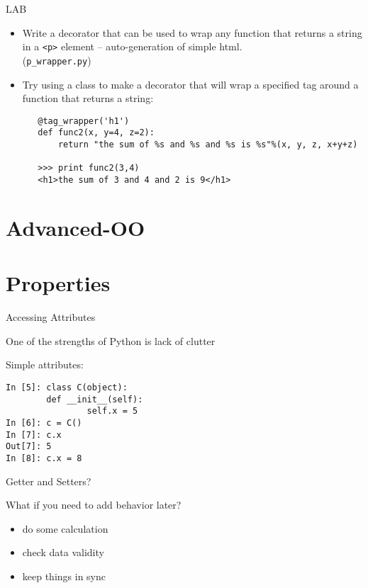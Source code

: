 \documentclass{beamer}
\begin{document}
\begin{frame}[fragile]{LAB}

\begin{itemize}
  \item Write a decorator that can be used to wrap any function that returns a string in a \verb|<p>| element -- auto-generation of simple html.\\
 (\verb|p_wrapper.py|)      

  \item Try using a class to make a decorator that will wrap a
   specified tag around a function that returns a string:
   \begin{verbatim}
   @tag_wrapper('h1')
   def func2(x, y=4, z=2):
       return "the sum of %s and %s and %s is %s"%(x, y, z, x+y+z)

   >>> print func2(3,4)
   <h1>the sum of 3 and 4 and 2 is 9</h1>
   \end{verbatim}
\end{itemize}

\end{frame}



\section{Advanced-OO}

\section{Properties}

\begin{frame}[fragile]{Accessing Attributes}

{\Large One of the strengths of Python is lack of clutter}

\vfill
{\Large Simple attributes:}

\begin{verbatim}
In [5]: class C(object):
        def __init__(self):
                self.x = 5
In [6]: c = C()
In [7]: c.x
Out[7]: 5
In [8]: c.x = 8
\end{verbatim}

\end{frame} 

\begin{frame}[fragile]{Getter and Setters?}

{\Large What if you need to add behavior later?}

\begin{itemize}
  \item do some calculation
  \item check data validity
  \item keep things in sync
\end{itemize}

\end{frame}
\end{document}
